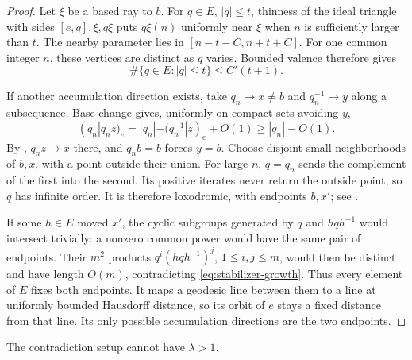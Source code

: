 \begin{proof}
Let $\xi$ be a based ray to $b$. For $q\in E$, $|q|\le t$,
thinness of the ideal triangle with sides $[e,q],\xi,q\xi$ puts
$q\xi(n)$ uniformly near $\xi$ when $n$ is sufficiently larger
than $t$. The nearby parameter lies in $[n-t-C,n+t+C]$.
For one common integer $n$, these vertices are distinct as $q$ varies.
Bounded valence therefore gives
\begin{equation}
 \#\{q\in E:|q|\le t\}\le C'(t+1).
 \label{eq:stabilizer-growth}
\end{equation}

If another accumulation direction exists, take $q_n\to x\ne b$ and
$q_n^{-1}\to y$ along a subsequence. Base change gives, uniformly
on compact sets avoiding $y$,
\[
 (q_n|q_nz)_e=|q_n|-(q_n^{-1}|z)_e+O(1)\ge |q_n|-O(1).
\]
By , $q_nz\to x$ there, and $q_nb=b$ forces $y=b$.
Choose disjoint small neighborhoods of $b,x$, with a point outside
their union. For large $n$, $q=q_n$ sends the complement of the
first into the second. Its positive iterates never return the outside
point, so $q$ has infinite order. It is therefore loxodromic, with
endpoints $b,x'$; see \cite[III.$\Gamma$.3.10]{BH}.

If some $h\in E$ moved $x'$, the cyclic subgroups generated by $q$
and $hqh^{-1}$ would intersect trivially: a nonzero common power
would have the same pair of endpoints. Their $m^2$ products
$q^i(hqh^{-1})^j$, $1\le i,j\le m$, would then be distinct and have
length $O(m)$, contradicting \eqref{eq:stabilizer-growth}.
Thus every element of $E$ fixes both endpoints. It maps a geodesic
line between them to a line at uniformly bounded Hausdorff distance,
so its orbit of $e$ stays a fixed distance from that line. Its only
possible accumulation directions are the two endpoints.
\end{proof}

\begin{proposition}
\label{prop:no-exponential-records}
The contradiction setup cannot have $\lambda>1$.
\end{proposition}

